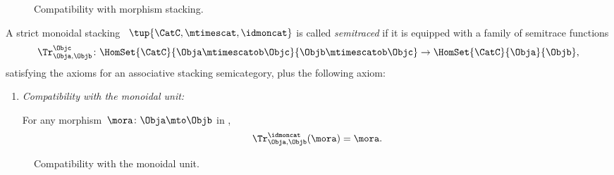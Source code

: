     \begin{figure}[h!]
    \centering
    \caption{Compatibility with morphism stacking.}
    \label{fig:axiomatic-semicat-semitrace-superposing}
\end{figure}
    
    \begin{ctdefinition}
        \label{def:semitraced-strict-mon-scat}
       A strict monoidal stacking ~$\tup{\CatC, \mtimescat, \idmoncat }$ is called \emph{semitraced} if it is equipped with a family of semitrace functions
        \begin{equation}
            \Tr_{\Obja,\Objb}^\Objc\colon \HomSet{\CatC}{\Obja \mtimescatob \Objc}{\Objb\mtimescatob \Objc}\to \HomSet{\CatC}{\Obja}{\Objb},
        \end{equation}
        satisfying the axioms for an associative stacking semicategory, plus the following axiom:
        \begin{enumerate}

            \item \emph{Compatibility with the monoidal unit:}
            
                  For any morphism~$\mora \colon \Obja\mto \Objb$ in \CatC,
                  \begin{equation}
                      \label{eq:semicat-semitrace-vanishing_1}
                      \Tr_{\Obja,\Objb}^\idmoncat (\mora)=\mora.
                  \end{equation}

        \end{enumerate}
    \end{ctdefinition}

\begin{figure}[h!]
    \centering
    \caption{Compatibility with the monoidal unit.}
    \label{fig:axiomatic-semicat-semitrace-vanishing-I}
\end{figure}


